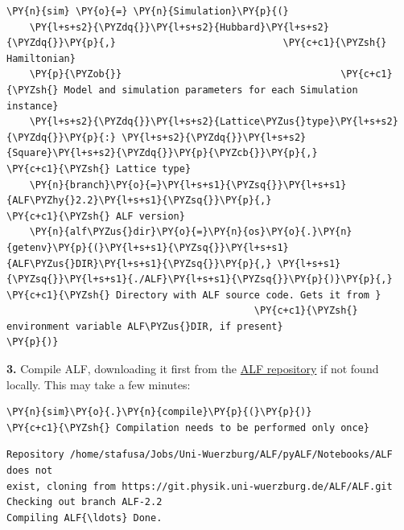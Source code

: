     \begin{tcolorbox}[breakable, size=fbox, boxrule=1pt, pad at break*=1mm,colback=cellbackground, colframe=cellborder]
\begin{Verbatim}[commandchars=\\\{\}]
\PY{n}{sim} \PY{o}{=} \PY{n}{Simulation}\PY{p}{(}
    \PY{l+s+s2}{\PYZdq{}}\PY{l+s+s2}{Hubbard}\PY{l+s+s2}{\PYZdq{}}\PY{p}{,}                             \PY{c+c1}{\PYZsh{} Hamiltonian}
    \PY{p}{\PYZob{}}                                      \PY{c+c1}{\PYZsh{} Model and simulation parameters for each Simulation instance}
    \PY{l+s+s2}{\PYZdq{}}\PY{l+s+s2}{Lattice\PYZus{}type}\PY{l+s+s2}{\PYZdq{}}\PY{p}{:} \PY{l+s+s2}{\PYZdq{}}\PY{l+s+s2}{Square}\PY{l+s+s2}{\PYZdq{}}\PY{p}{\PYZcb{}}\PY{p}{,}             \PY{c+c1}{\PYZsh{} Lattice type}
    \PY{n}{branch}\PY{o}{=}\PY{l+s+s1}{\PYZsq{}}\PY{l+s+s1}{ALF\PYZhy{}2.2}\PY{l+s+s1}{\PYZsq{}}\PY{p}{,}                      \PY{c+c1}{\PYZsh{} ALF version}
    \PY{n}{alf\PYZus{}dir}\PY{o}{=}\PY{n}{os}\PY{o}{.}\PY{n}{getenv}\PY{p}{(}\PY{l+s+s1}{\PYZsq{}}\PY{l+s+s1}{ALF\PYZus{}DIR}\PY{l+s+s1}{\PYZsq{}}\PY{p}{,} \PY{l+s+s1}{\PYZsq{}}\PY{l+s+s1}{./ALF}\PY{l+s+s1}{\PYZsq{}}\PY{p}{)}\PY{p}{,} \PY{c+c1}{\PYZsh{} Directory with ALF source code. Gets it from }
                                           \PY{c+c1}{\PYZsh{} environment variable ALF\PYZus{}DIR, if present}
\PY{p}{)}
\end{Verbatim}
\end{tcolorbox}

    \textbf{3.} Compile ALF, downloading it first from the
\href{https://git.physik.uni-wuerzburg.de:ALF}{ALF repository} if not
found locally. This may take a few minutes:

    \begin{tcolorbox}[breakable, size=fbox, boxrule=1pt, pad at break*=1mm,colback=cellbackground, colframe=cellborder]
\begin{Verbatim}[commandchars=\\\{\}]
\PY{n}{sim}\PY{o}{.}\PY{n}{compile}\PY{p}{(}\PY{p}{)}                              \PY{c+c1}{\PYZsh{} Compilation needs to be performed only once}
\end{Verbatim}
\end{tcolorbox}

    \begin{Verbatim}[commandchars=\\\{\}]
Repository /home/stafusa/Jobs/Uni-Wuerzburg/ALF/pyALF/Notebooks/ALF does not
exist, cloning from https://git.physik.uni-wuerzburg.de/ALF/ALF.git
Checking out branch ALF-2.2
Compiling ALF{\ldots} Done.
    \end{Verbatim}


